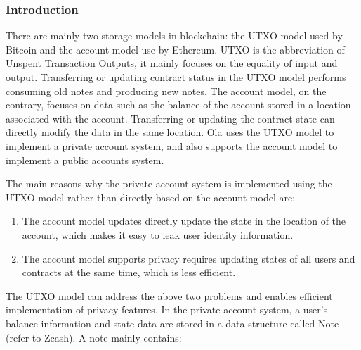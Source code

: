 \subsubsection{Introduction}\label{section: note-introduction}

There are mainly two storage models in blockchain:  the UTXO model used by Bitcoin and the account model use by Ethereum. UTXO is the abbreviation of Unspent Transaction Outputs, it mainly focuses on the equality of input and output. Transferring or updating contract status in the UTXO model performs consuming old notes and producing new notes. The account model, on the contrary, focuses on data such as the balance of the account stored in a location associated with the account. Transferring or updating the contract state can directly modify the data in the same location. Ola uses the UTXO model to implement a private account system, and also supports the account model to implement a public accounts system.

The main reasons why the private account system is implemented using the UTXO model rather than directly based on the account model are:

\begin{enumerate}
    \item The account model updates directly update the state in the location of the account, which makes it easy to leak user identity information.
    \item The account model supports privacy requires updating states of all users and contracts at the same time, which is less efficient.
\end{enumerate}

The UTXO model can address the above two problems and enables efficient implementation of privacy features. In the private account system, a user's balance information and state data are stored in a data structure called Note (refer to Zcash). A note mainly contains:

